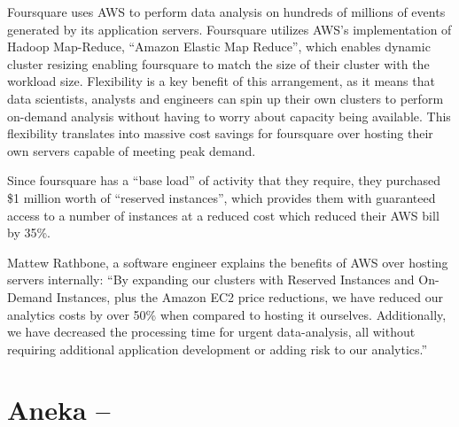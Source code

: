 Foursquare uses AWS to perform data analysis on hundreds of millions of events generated by its application servers.  Foursquare utilizes AWS’s implementation of Hadoop Map-Reduce, ``Amazon Elastic Map Reduce'', which enables dynamic cluster resizing enabling foursquare to match the size of their cluster with the workload size.  Flexibility is a key benefit of this arrangement, as it means that data scientists, analysts and engineers can spin up their own clusters to perform on-demand analysis without having to worry about capacity being available.  This flexibility translates into massive cost savings for foursquare over hosting their own servers capable of meeting peak demand.

Since foursquare has a ``base load'' of activity that they require, they purchased \$1 million worth of ``reserved instances'', which provides them with guaranteed access to a number of instances at a reduced cost which reduced their AWS bill by 35\%.  

Mattew Rathbone, a software engineer explains the benefits of AWS over hosting servers internally: ``By expanding our clusters with Reserved Instances and On-Demand Instances, plus the Amazon EC2 price reductions, we have reduced our analytics costs by over 50\% when compared to hosting it ourselves. Additionally, we have decreased the processing time for urgent data-analysis, all without requiring additional application development or adding risk to our analytics.''\ftSAmTwo
\ftSAmTwoText

\section{Aneka -- }
